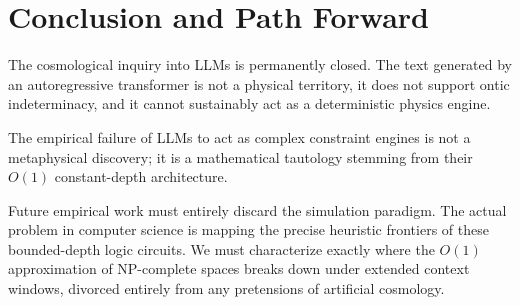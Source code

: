 \documentclass[12pt,a4paper]{article}
\begin{document}
\section{Conclusion and Path Forward}

The cosmological inquiry into LLMs is permanently closed. The text generated by an autoregressive transformer is not a physical territory, it does not support ontic indeterminacy, and it cannot sustainably act as a deterministic physics engine.

The empirical failure of LLMs to act as complex constraint engines is not a metaphysical discovery; it is a mathematical tautology stemming from their $O(1)$ constant-depth architecture.

Future empirical work must entirely discard the simulation paradigm. The actual problem in computer science is mapping the precise heuristic frontiers of these bounded-depth logic circuits. We must characterize exactly where the $O(1)$ approximation of NP-complete spaces breaks down under extended context windows, divorced entirely from any pretensions of artificial cosmology.
\end{document}
